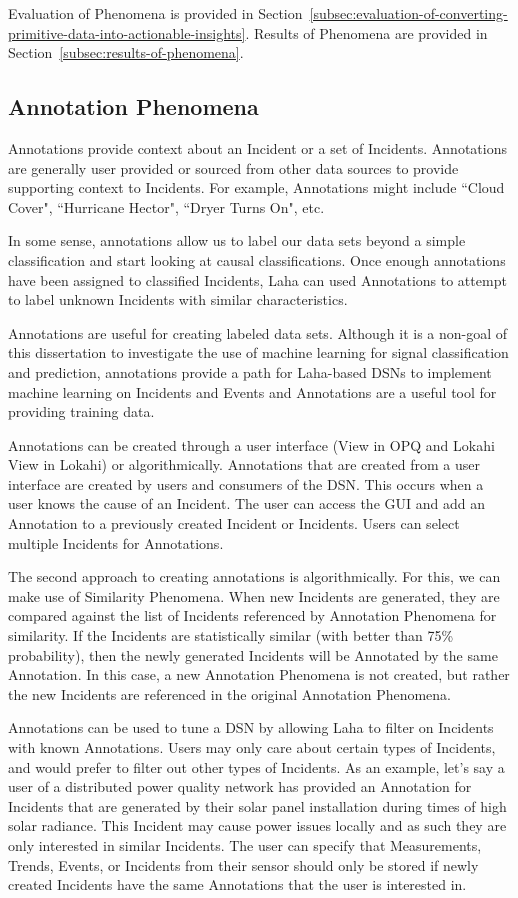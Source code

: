 Evaluation of Phenomena is provided in Section~\ref{subsec:evaluation-of-converting-primitive-data-into-actionable-insights}. Results of Phenomena are provided in Section~\ref{subsec:results-of-phenomena}.

\subsection{Annotation Phenomena}\label{subsec:annotations-phenomena}
Annotations provide context about an Incident or a set of Incidents. Annotations are generally user provided or sourced from other data sources to provide supporting context to Incidents. For example, Annotations might include ``Cloud Cover", ``Hurricane Hector", ``Dryer Turns On", etc.

In some sense, annotations allow us to label our data sets beyond a simple classification and start looking at causal classifications. Once enough annotations have been assigned to classified Incidents, Laha can used Annotations to attempt to label unknown Incidents with similar characteristics.

Annotations are useful for creating labeled data sets. Although it is a non-goal of this dissertation to investigate the use of machine learning for signal classification and prediction, annotations provide a path for Laha-based DSNs to implement machine learning on Incidents and Events and Annotations are a useful tool for providing training data.

Annotations can be created through a user interface (View in OPQ and Lokahi View in Lokahi) or algorithmically. Annotations that are created from a user interface are created by users and consumers of the DSN. This occurs when a user knows the cause of an Incident. The user can access the GUI and add an Annotation to a previously created Incident or Incidents. Users can select multiple Incidents for Annotations.

The second approach to creating annotations is algorithmically. For this, we can make use of Similarity Phenomena. When new Incidents are generated, they are compared against the list of Incidents referenced by Annotation Phenomena for similarity. If the Incidents are statistically similar (with better than 75\% probability), then the newly generated Incidents will be Annotated by the same Annotation. In this case, a new Annotation Phenomena is not created, but rather the new Incidents are referenced in the original Annotation Phenomena.

Annotations can be used to tune a DSN by allowing Laha to filter on Incidents with known Annotations. Users may only care about certain types of Incidents, and would prefer to filter out other types of Incidents. As an example, let's say a user of a distributed power quality network has provided an Annotation for Incidents that are generated by their solar panel installation during times of high solar radiance. This Incident may cause power issues locally and as such they are only interested in similar Incidents. The user can specify that Measurements, Trends, Events, or Incidents from their sensor should only be stored if newly created Incidents have the same Annotations that the user is interested in.

